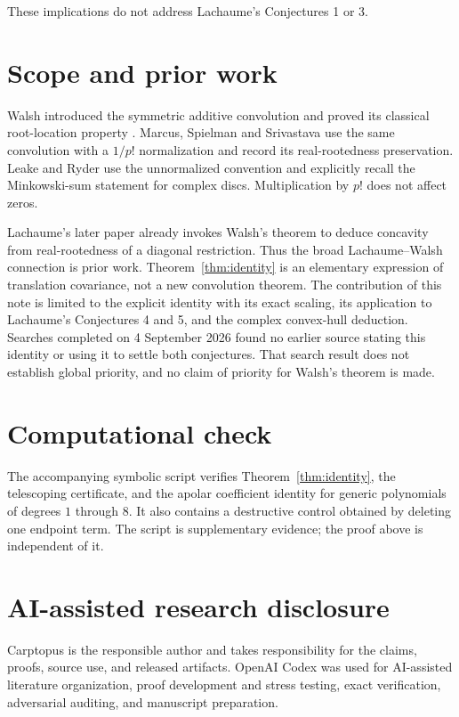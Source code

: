 \documentclass[11pt]{article}
\begin{document}
These implications do not address Lachaume's Conjectures 1 or 3.

\section{Scope and prior work}


Walsh introduced the symmetric additive convolution and proved its classical
root-location property \cite{walsh}. Marcus, Spielman and Srivastava \cite[Definition~1.1 and Theorem~1.3]{mss} use the same convolution with a \(1/p!\) normalization and
record its real-rootedness preservation. Leake and Ryder \cite{leake-ryder} use the
unnormalized convention and explicitly recall the Minkowski-sum statement for
complex discs. Multiplication by \(p!\) does not affect zeros.

Lachaume's later paper \cite[Theorem~2.7(d)]{lachaume-lovelock} already invokes Walsh's theorem to
deduce concavity from real-rootedness of a diagonal restriction. Thus the
broad Lachaume--Walsh connection is prior work. Theorem~\ref{thm:identity} is an elementary
expression of translation covariance, not a new convolution theorem. The
contribution of this note is limited to the explicit identity with its exact
scaling, its application to Lachaume's Conjectures 4 and 5, and the complex
convex-hull deduction. Searches completed on 4 September 2026 found no earlier
source stating this identity or using it to settle both conjectures. That
search result does not establish global priority, and no claim of priority for
Walsh's theorem is made.

\section*{Computational check}


The accompanying symbolic script verifies Theorem~\ref{thm:identity}, the telescoping
certificate, and the apolar coefficient identity for generic polynomials of
degrees \(1\) through \(8\). It also contains a destructive control obtained by
deleting one endpoint term. The script is supplementary evidence; the proof
above is independent of it.

\section*{AI-assisted research disclosure}


Carptopus is the responsible author and takes responsibility for the claims,
proofs, source use, and released artifacts. OpenAI Codex was used for
AI-assisted literature organization, proof development and stress testing,
exact verification, adversarial auditing, and manuscript preparation.
\end{document}
